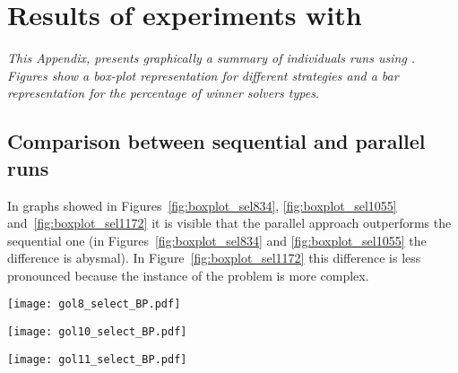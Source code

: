 \chapter{Results of experiments with \grp}
\label{app:grp}
\textit{This Appendix, presents graphically a summary of individuals runs using \grp. Figures show a \textit{box-plot} representation for different strategies and a bar representation for the percentage of winner solvers types.}

\vspace{2ex}\vfill
\minitoc
\newpage

\section{Comparison between sequential and parallel runs}

\begin{minipage}[c]{0.45\textwidth}
In graphs showed in Figures~\ref{fig:boxplot_sel834}, \ref{fig:boxplot_sel1055} and~\ref{fig:boxplot_sel1172} it is visible that the parallel approach outperforms the sequential one (in Figures~\ref{fig:boxplot_sel834} and \ref{fig:boxplot_sel1055} the difference is abysmal). In Figure~\ref{fig:boxplot_sel1172} this difference is less pronounced because the instance of the problem is more complex.
\end{minipage}
\hspace{0.05\textwidth}
\begin{minipage}[c]{0.45\textwidth}
\centering
\texttt{[image: gol8\_select\_BP.pdf]}
\label{fig:boxplot_sel834}
\end{minipage}


\begin{minipage}[c]{0.45\textwidth}
\centering
\texttt{[image: gol10\_select\_BP.pdf]}
\label{fig:boxplot_sel1055}
\end{minipage}\hspace{0.05\textwidth}
\begin{minipage}[c]{0.45\textwidth}
\centering
\texttt{[image: gol11\_select\_BP.pdf]}
\label{fig:boxplot_sel1172}
\end{minipage}


